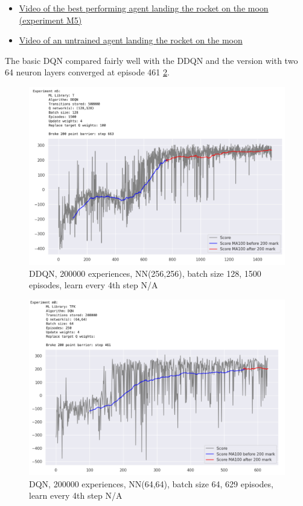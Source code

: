 \documentclass{article}
\begin{document}
\begin{itemize}
  \item \href{https://youtu.be/csrk1gOcRPU}{Video of the best performing agent landing the rocket on the moon (experiment M5) } 
  \item \href{https://youtu.be/Jb_1M_E6ofE}{Video of an untrained agent landing the rocket on the moon } 
\end{itemize}

The basic DQN compared fairly well with the DDQN and the version with two 64 neuron layers converged at episode 461 \ref{fig:2}. 

\begin{figure}[!h]
  \centering
	\includegraphics[width=1.0\textwidth]{figures/m5.png}
  \caption{DDQN, 200000 experiences, NN(256,256), batch size 128, 1500 episodes, learn every 4th step N/A}
  \label{fig:1}
\end{figure}

\begin{figure}[!h]
  \centering
	\includegraphics[width=1.0\textwidth]{figures/m0.png}
  \caption{DQN, 200000 experiences, NN(64,64), batch size 64, 629 episodes, learn every 4th step N/A}
  \label{fig:2}
\end{figure}
\end{document}
